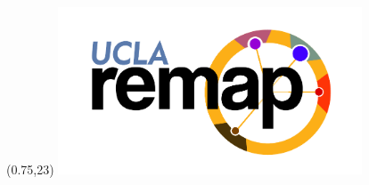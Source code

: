 \documentclass[a0,portrait,svgnames]{a0poster}
\begin{document}
\begin{textblock}{4}(0.75,23)    
\includegraphics[width=9cm]{images/REMAP-Logo-vector.pdf}
\end{textblock}
\end{document}
